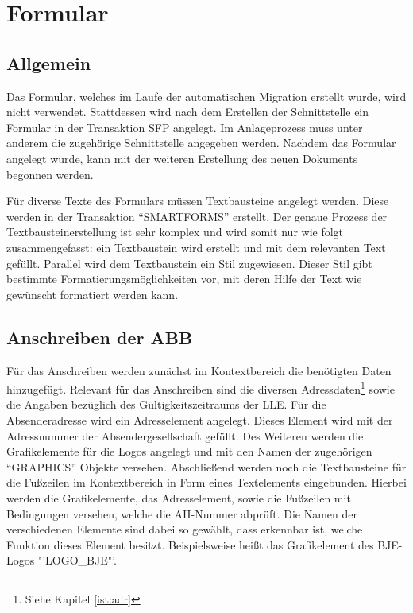 \FloatBarrier
\section{Formular}
\subsection{Allgemein}

Das Formular, welches im Laufe der automatischen Migration erstellt wurde, wird nicht verwendet. Stattdessen wird nach dem Erstellen der Schnittstelle ein Formular in der Transaktion SFP angelegt. Im Anlageprozess muss unter anderem die zugehörige Schnittstelle angegeben werden. Nachdem das Formular angelegt wurde, kann mit der weiteren Erstellung des neuen Dokuments begonnen werden.

Für diverse Texte des Formulars müssen Textbausteine angelegt werden. Diese werden in der Transaktion "`SMARTFORMS"' erstellt. Der genaue Prozess der Textbausteinerstellung ist sehr komplex und wird somit nur wie folgt zusammengefasst: ein Textbaustein wird erstellt und mit dem relevanten Text gefüllt. Parallel wird dem Textbaustein ein Stil zugewiesen. Dieser Stil gibt bestimmte Formatierungsmöglichkeiten vor, mit deren Hilfe der Text wie gewünscht formatiert werden kann.

\subsection{Anschreiben der \acs{ABB}}

Für das Anschreiben werden zunächst im Kontextbereich die benötigten Daten hinzugefügt. Relevant für das Anschreiben sind die diversen Adressdaten\footnote{Siehe Kapitel \ref{ist:adr}} sowie die Angaben bezüglich des Gültigkeitszeitraums der \ac{LLE}. Für die Absenderadresse wird ein Adresselement angelegt. Dieses Element wird mit der Adressnummer der Absendergesellschaft gefüllt. Des Weiteren werden die Grafikelemente für die Logos angelegt und mit den Namen der zugehörigen "`GRAPHICS"' Objekte versehen. Abschließend werden noch die Textbausteine für die Fußzeilen im Kontextbereich in Form eines Textelements eingebunden. Hierbei werden die Grafikelemente, das Adresselement, sowie die Fußzeilen mit Bedingungen versehen, welche die \ac{AH}-Nummer abprüft. Die Namen der verschiedenen Elemente sind dabei so gewählt, dass erkennbar ist, welche Funktion dieses Element besitzt. Beispielsweise heißt das Grafikelement des \ac{BJE}-Logos "'LOGO\_BJE"'. 

